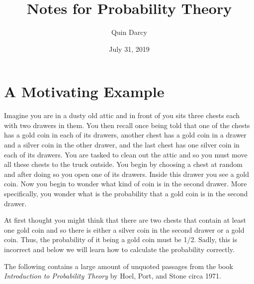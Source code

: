 \documentclass{article}
\theoremstyle{definition}
\theoremstyle{remark}
\theoremstyle{definition}
\begin{document}
\title{Notes for Probability Theory}
\author{Quin Darcy}
\date{July 31, 2019}
\maketitle

\section{A Motivating Example}

Imagine you are in a dusty old attic and in front of you sits three chests each with two drawers in them. You then recall once being told that one of the chests has a gold coin in each of its drawers, another chest has a gold coin in a drawer and a silver coin in the other drawer, and the last chest has one silver coin in each of its drawers. You are tasked to clean out the attic and so you must move all these chests to the truck outside. You begin by choosing a chest at random and after doing so you open one of its drawers. Inside this drawer you see a gold coin. Now you begin to wonder what kind of coin is in the second drawer. More specifically, you wonder what is the probability that a gold coin is in the second drawer.\par 
At first thought you might think that there are two chests that contain at least one gold coin and so there is either a silver coin in the second drawer or a gold coin. Thus, the probability of it being a gold coin must be 1/2. Sadly, this is incorrect and below we will learn how to calculate the probability correctly.

\vspace{4mm} The following contains a large amount of unquoted passages from the book \textit{Introduction to Probability Theory} by Hoel, Port, and Stone circa 1971.
\end{document}

